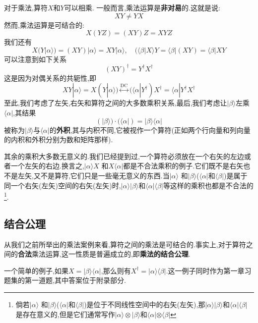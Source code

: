 \documentclass[lang=cn,newtx,10pt,scheme=chinese,thmcnt=section]{elegantbook}
\begin{document}
对于乘法,算符$X$和$Y$可以相乘. 一般而言,乘法运算是\textbf{非对易}的.这就是说:
\begin{equation}
	XY\ne YX 
\end{equation}
然而,乘法运算是可结合的:
\begin{equation}
	X(YZ)=(XY)Z=XYZ
\end{equation}
我们还有
$$X(Y|\alpha\rangle)=(XY)|\alpha\rangle=XY|\alpha\rangle,\quad(\langle\beta|X\rangle Y=\langle\beta|(XY)=\langle\beta|XY$$
可以注意到如下关系
\begin{equation}
	(XY)^\dagger=Y^\dagger X^\dagger
\end{equation}
这是因为对偶关系的共轭性,即
\begin{equation}
	XY|\alpha\rangle=X(Y|\alpha\rangle)\overset{\mathrm{DC}}{\operatorname*{\leftrightarrow}}(\langle\alpha|Y^\dagger)X^\dagger=\langle\alpha|Y^\dagger X^\dagger 
\end{equation}
至此,我们考虑了左矢,右矢和算符之间的大多数乘积关系,最后,我们考虑让$|\beta\rangle$左乘$\langle\alpha|$,其结果
\begin{equation}
	(|\beta\rangle)\cdot(\langle\alpha|)=|\beta\rangle\langle\alpha|
\end{equation}
被称为$|\beta\rangle$与$\langle\alpha|$的\textbf{外积},其与内积不同,它被视作一个算符(正如两个行向量和列向量的内积和外积分别为数和矩阵那样).

其余的乘积大多数无意义的.我们已经提到过,一个算符必须放在一个右矢的左边或者一个左矢的右边.换言之,$|\alpha\rangle X$ 和$X\langle\alpha|$都是不合法乘积的例子.它们既不是右矢也不是左矢,又不是算符,它们只是一些毫无意义的东西.当$|\alpha\rangle$ 和$|\beta\rangle$($\langle\alpha|$和$\langle\beta|$)是属于同一个右矢(左矢)空间的右矢(左矢)时,$|\alpha\rangle|\beta\rangle$和$\langle\alpha|\langle\beta|$等这样的乘积也都是不合法的\footnote{倘若$|\alpha\rangle$ 和$|\beta\rangle$($\langle\alpha|$和$\langle\beta|$)是位于不同线性空间中的右矢(左矢),那$|\alpha\rangle|\beta\rangle$和$\langle\alpha|\langle\beta|$是存在意义的,但是它们通常写作$|\alpha\rangle\otimes|\beta\rangle$和$\langle\alpha|\otimes\langle\beta|$}.
\subsection*{结合公理}
从我们之前所举出的乘法案例来看,算符之间的乘法是可结合的.事实上,对于算符之间的\textbf{合法}乘法运算,这一性质是普遍成立的,即\textbf{乘法的结合公理}.

一个简单的例子,如果$X=|\beta\rangle\langle\alpha|$,那么则有$X^\dagger=|\alpha\rangle\langle\beta|$.这一例子同时作为第一章习题集的第一道题,其中答案位于附录部分.
\end{document}
